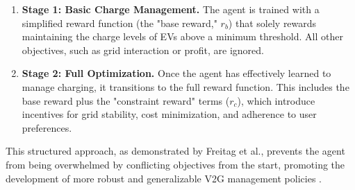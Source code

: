 \begin{enumerate}
    \item \textbf{Stage 1: Basic Charge Management.} The agent is trained with a simplified reward function (the "base reward," $r_b$) that solely rewards maintaining the charge levels of EVs above a minimum threshold. All other objectives, such as grid interaction or profit, are ignored.
    \item \textbf{Stage 2: Full Optimization.} Once the agent has effectively learned to manage charging, it transitions to the full reward function. This includes the base reward plus the "constraint reward" terms ($r_c$), which introduce incentives for grid stability, cost minimization, and adherence to user preferences.
\end{enumerate}
This structured approach, as demonstrated by Freitag et al., prevents the agent from being overwhelmed by conflicting objectives from the start, promoting the development of more robust and generalizable V2G management policies \cite{Curriculum_learning}.
